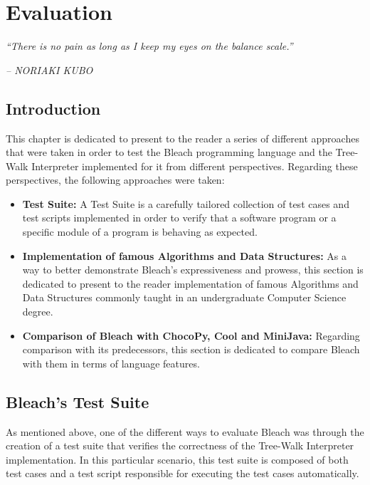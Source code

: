 \chapter{Evaluation} \label{cap:Resultados}

\begin{displayquote}
    \begin{center}
        \textit{``There is no pain as long as I keep my eyes on the balance scale.''}
    \end{center}
\end{displayquote}

\begin{flushright}
   \textit{-- NORIAKI KUBO}
\end{flushright}

\section{Introduction}
This chapter is dedicated to present to the reader a series of different approaches that were taken in order to test the Bleach programming language and the Tree-Walk Interpreter implemented for it from different perspectives. Regarding these perspectives, the following approaches were taken:
\begin{itemize}
    \item \textbf{Test Suite:} A Test Suite is a carefully tailored collection of test cases and test scripts implemented in order to verify that a software program or a specific module of a program is behaving as expected.
    
    \item \textbf{Implementation of famous Algorithms and Data Structures:} As a way to better demonstrate Bleach's expressiveness and prowess, this section is dedicated to present to the reader implementation of famous Algorithms and Data Structures commonly taught in an undergraduate Computer Science degree.
    
    \item \textbf{Comparison of Bleach with ChocoPy, Cool and MiniJava:} Regarding comparison with its predecessors, this section is dedicated to compare Bleach with them in terms of language features.
\end{itemize}


\section{Bleach's Test Suite}
As mentioned above, one of the different ways to evaluate Bleach was through the creation of a test suite that verifies the correctness of the Tree-Walk Interpreter implementation. In this particular scenario, this test suite is composed of both test cases and a test script responsible for executing the test cases automatically.

